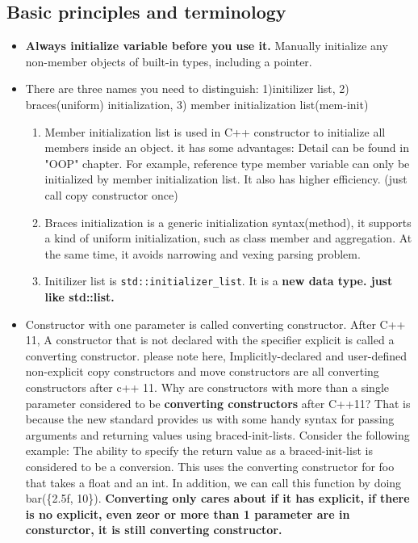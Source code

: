 \documentclass[a4paper,11pt,twoside]{book}
\begin{document}
\subsection{Basic principles and terminology}
\begin{itemize}
	\item \textbf{Always initialize variable before you use it.} Manually initialize any non-member objects of built-in types, including a pointer.
	
	\item There are three names you need to distinguish: 1)initilizer list, 2) braces(uniform) initialization, 3) member initialization list(mem-init)

	\begin{enumerate}
		\item Member initialization list is used in C++ constructor to initialize all members inside an object. it has some advantages: Detail can be found in "OOP" chapter. For example, reference type member variable can only be initialized by member initialization list. It also has higher efficiency. (just call copy constructor once) 
		
		\item Braces initialization is a generic initialization syntax(method), it supports a kind of uniform initialization, such as class member and aggregation. At the same time, it avoids narrowing and vexing parsing problem. 
		
		\item Initilizer list is \texttt{std::initializer\_list}. It is a \textbf{new data type. just like std::list.}
	\end{enumerate}

	\item Constructor with one parameter is called converting constructor. After C++ 11, A constructor that is not declared with the specifier explicit is called a converting constructor. please note here, Implicitly-declared and user-defined non-explicit copy constructors and move constructors are all converting constructors after c++ 11. Why are constructors with more than a single parameter considered to be \textbf{converting constructors} after C++11? That is because the new standard provides us with some handy syntax for passing arguments and returning values using braced-init-lists. Consider the following example: The ability to specify the return value as a braced-init-list is considered to be a conversion. This uses the converting constructor for foo that takes a float and an int. In addition, we can call this function by doing bar(\{2.5f, 10\}). \textbf{Converting only cares about if it has explicit, if there is no explicit, even zeor or more than 1 parameter are in consturctor, it is still converting constructor.} 


\end{itemize}
\end{document}
